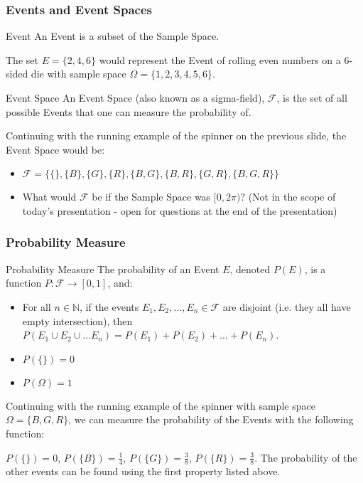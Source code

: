 \documentclass{beamer}
\begin{document}
\begin{frame}
  \frametitle{Events and Event Spaces}
  \begin{block}{Event \parencite[p.~192]{measure_tao}}
    An Event is a subset of the Sample Space.
  \end{block}
  \begin{example}
  The set $E = \{2,4,6\}$ would represent the Event of rolling even numbers on a 6-sided die with sample space $\Omega = \{1,2,3,4,5,6\}$.
  \end{example}
\end{frame}
\begin{frame}
  \begin{block}{Event Space \parencite[p.~192]{measure_tao}}
    An Event Space (also known as a sigma-field), $\mathscr{F}$, is the set of all possible Events that one can measure the probability of.
  \end{block}
  \begin{example}
    Continuing with the running example of the spinner on the previous slide, the Event Space would be:

    \begin{itemize}
      \item $\mathscr{F} = \{\{\}, \{B\}, \{G\}, \{R\}, \{B,G\}, \{B,R\}, \{G, R\}, \{B, G, R\}\}$
    \pause

      \item What would $\mathscr{F}$ be if the Sample Space was $[0,2\pi)$? (Not in the scope of today's presentation - open for questions at the end of the presentation)
    \end{itemize}
  \end{example}
\end{frame}
\begin{frame}
  \frametitle{Probability Measure}
  \begin{block}{Probability Measure \parencite[p.~10]{daners}}
    The probability of an Event $E$, denoted $P(E)$, is a function $P: \mathscr{F} \rightarrow [0,1]$, and:
    \begin{itemize}
      \item For all $n \in \mathbb{N}$, if the events $E_1, E_2, \ldots, E_n \in \mathscr{F}$ are disjoint (i.e. they all have empty intersection), then $P(E_1 \cup E_2 \cup \ldots E_n) = P(E_1) + P(E_2) + \ldots + P(E_n)$.
      \item $P(\{\}) = 0$
      \item $P(\Omega) = 1$
    \end{itemize}
  \end{block}
  \begin{example}
    Continuing with the running example of the spinner with sample space $\Omega = \{B, G, R\}$, we can measure the probability of the Events with the following function:

    $P(\{\}) = 0$, $P(\{B\}) = \frac{1}{4}$, $P(\{G\}) = \frac{3}{8}$, $P(\{R\}) = \frac{3}{8}$. The probability of the other events can be found using the first property listed above.
  \end{example}
\end{frame}
\end{document}
